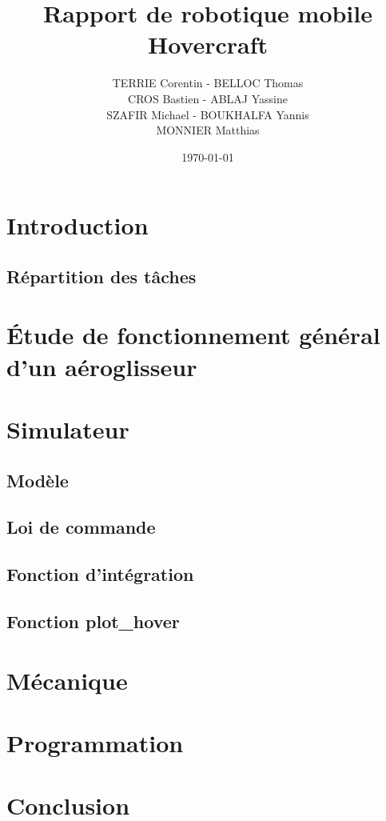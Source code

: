 \documentclass[a4paper,10pt]{article}
\title{Rapport de robotique mobile Hovercraft}
\author{TERRIE Corentin - BELLOC Thomas \\ CROS Bastien - ABLAJ Yassine \\ SZAFIR Michael - BOUKHALFA Yannis \\ MONNIER Matthias}
\date{\today}
\begin{document}

\tableofcontents
\clearpage



\section{Introduction}



\subsection{Répartition des tâches}





\section{Étude de fonctionnement général d'un aéroglisseur}



\section{Simulateur}
\subsection{Modèle}
\subsection{Loi de commande}
\subsection{Fonction d'intégration}
\subsection{Fonction plot_hover}


\section{Mécanique}



\section{Programmation}


\section{Conclusion}
\end{document}
